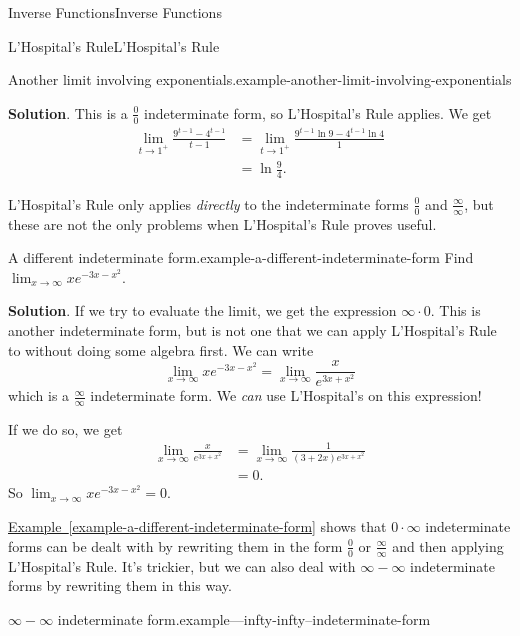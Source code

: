 \documentclass[10pt,]{book}
\numberwithin{equation}{section}
\begin{document}
\begin{chapterptx}{Inverse Functions}{}{Inverse Functions}{}{}
\begin{sectionptx}{L'Hospital's Rule}{}{L'Hospital's Rule}{}{}
\begin{example}{Another limit involving exponentials.}{example-another-limit-involving-exponentials}
\par\smallskip%
\noindent\textbf{Solution}.\hypertarget{solution-65}{}\quad%
\hypertarget{p-295}{}%
This is a \(\frac{0}{0}\) indeterminate form, so L'Hospital's Rule applies. We get%
\begin{align*}
\lim_{t\to1^{+}}\frac{9^{t-1} - 4^{t-1}}{t-1} & = \lim_{t\to1^{+}}\frac{9^{t-1}\ln9 - 4^{t-1}\ln4}{1} \\
& = \ln\frac{9}{4}. 
\end{align*}
%
\end{example}
\hypertarget{p-296}{}%
L'Hospital's Rule only applies \emph{directly} to the indeterminate forms \(\frac{0}{0}\) and \(\frac{\infty}{\infty}\), but these are not the only problems when L'Hospital's Rule proves useful.%
\begin{example}{A different indeterminate form.}{example-a-different-indeterminate-form}%
\hypertarget{p-297}{}%
Find \(\lim_{x\to\infty}xe^{-3x - x^{2}}\).%
\par\smallskip%
\noindent\textbf{Solution}.\hypertarget{solution-66}{}\quad%
\hypertarget{p-298}{}%
If we try to evaluate the limit, we get the expression \(\infty\cdot0\). This is another indeterminate form, but is not one that we can apply L'Hospital's Rule to without doing some algebra first. We can write%
\begin{equation*}
\lim_{x\to\infty}xe^{-3x-x^{2}} = \lim_{x\to\infty}\frac{x}{e^{3x+x^{2}}}
\end{equation*}
which is a \(\frac{\infty}{\infty}\) indeterminate form. We \emph{can} use L'Hospital's on this expression!%
\par
\hypertarget{p-299}{}%
If we do so, we get%
\begin{align*}
\lim_{x\to\infty}\frac{x}{e^{3x+x^{2}}} & = \lim_{x\to\infty}\frac{1}{(3+2x)e^{3x+x^{2}}} \\
& = 0. 
\end{align*}
So \(\lim_{x\to\infty}xe^{-3x-x^{2}} = 0\).%
\end{example}
\hypertarget{p-300}{}%
\hyperref[example-a-different-indeterminate-form]{Example~\ref{example-a-different-indeterminate-form}} shows that \(0\cdot\infty\) indeterminate forms can be dealt with by rewriting them in the form \(\frac{0}{0}\) or \(\frac{\infty}{\infty}\) and then applying L'Hospital's Rule. It's trickier, but we can also deal with \(\infty-\infty\) indeterminate forms by rewriting them in this way.%
\begin{example}{\(\infty-\infty\) indeterminate form.}{example---infty-infty--indeterminate-form}%

\end{example}
\end{sectionptx}
\end{chapterptx}
\end{document}
